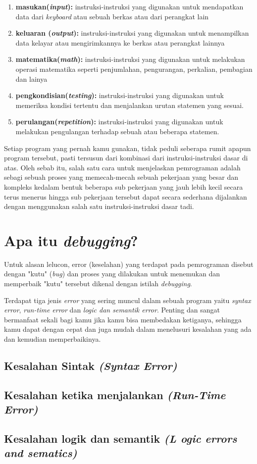 \begin{enumerate}
	\item \textbf{masukan(\textit{input}):} instruksi-instruksi yang digunakan untuk mendapatkan data dari \textit{keyboard} atau sebuah berkas atau dari perangkat lain
	\item \textbf{keluaran (\textit{output}):} instruksi-instruksi yang digunakan untuk menampilkan data kelayar atau mengirimkannya ke berkas atau perangkat lainnya
	\item \textbf{matematika(\textit{math}): }instruksi-instruksi yang digunakan untuk melakukan operasi matematika seperti penjumlahan, pengurangan, perkalian, pembagian dan lainya
	\item \textbf{pengkondisian(\textit{testing}):} instruksi-instruksi yang digunakan untuk memeriksa kondisi tertentu dan menjalankan urutan statemen yang sesuai.
	\item \textbf{perulangan(\textit{repetition}):} instruksi-instruksi yang digunakan untuk melakukan pengulangan terhadap sebuah atau beberapa statemen.
\end{enumerate}

Setiap program yang pernah kamu gunakan, tidak peduli seberapa rumit apapun program tersebut, pasti tersusun dari kombinasi dari instruksi-instruksi dasar di atas. Oleh sebab itu, salah satu cara untuk menjelaskan pemrograman adalah sebagi sebuah proses yang memecah-mecah sebuah pekerjaan yang besar dan kompleks kedalam bentuk beberapa sub pekerjaan yang jauh lebih kecil secara terus menerus hingga sub pekerjaan tersebut dapat secara sederhana dijalankan dengan menggunakan salah satu instruksi-instruksi dasar tadi.

\section{Apa itu \textit{debugging}?}

Untuk alasan lelucon, error (keselahan) yang terdapat pada pemrograman disebut dengan "kutu" (\textit{bug}) dan proses yang dilakukan untuk menemukan dan memperbaik "kutu" tersebut dikenal dengan istilah \textit{debugging}.

Terdapat tiga jenis \textit{error} yang sering muncul dalam sebuah program yaitu \textit{syntax error}, \textit{run-time error} dan \textit{logic dan semantik error}. Penting dan sangat bermanfaat sekali bagi kamu jika kamu bisa membedakan ketiganya,  sehingga kamu dapat dengan cepat dan juga mudah dalam menelusuri kesalahan yang ada dan kemudian memperbaikinya.

\subsection{Kesalahan Sintak \textit{(Syntax Error)}}
\subsection{Kesalahan ketika menjalankan \textit{(Run-Time Error)}}
\subsection{Kesalahan logik dan semantik \textit{(L
		ogic errors and sematics)}}